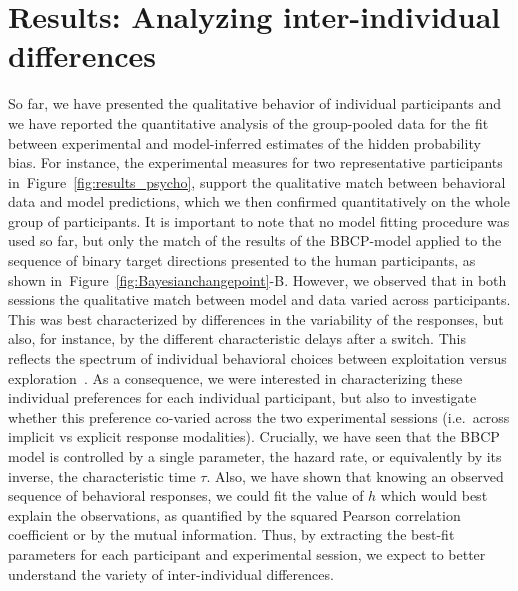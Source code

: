 \documentclass[10pt,letterpaper]{article}
\newcommand{\citep}[1]{\cite{#1}}
\newcommand{\seeFig}[1]{Figure~\ref{fig:#1}}
\begin{document}
\section{Results: Analyzing inter-individual differences}
\label{sec:inter}
So far, we have presented the qualitative behavior of individual participants and
we have reported the quantitative analysis of the group-pooled data
for the fit between experimental and model-inferred estimates of the hidden probability bias.
For instance, the experimental measures for two representative participants in~\seeFig{results_psycho},
support the qualitative match between behavioral data and model predictions,
which we then confirmed quantitatively on the whole group of participants.
It is important to note that no model fitting procedure was used so far,
but only the match of the results of the BBCP-model
applied to the sequence of binary target directions
presented to the human participants,
as shown in~\seeFig{Bayesianchangepoint}-B.
However, we observed that in both sessions the qualitative match between model and data varied across participants.
This was best characterized by differences
in the variability of the responses, but also, for instance,
by the different characteristic delays after a switch.
This reflects the spectrum of individual behavioral choices
between exploitation versus exploration~\citep{Behrens07}.
As a consequence, we were interested in characterizing these individual preferences
for each individual participant,
but also to investigate whether this preference co-varied
across the two experimental sessions (i.e.~across implicit vs explicit response modalities).
Crucially, we have seen that the BBCP model is controlled by a single parameter,
the hazard rate, or equivalently by its inverse, the characteristic time $\tau$.
Also, we have shown that knowing an observed sequence of behavioral responses,
we could fit the value of $h$ which would best explain the observations,
as quantified by the squared Pearson correlation coefficient or by the mutual information.
Thus, by extracting the best-fit parameters for each participant and experimental session,
we expect to better understand the variety of inter-individual differences. %
\end{document}
